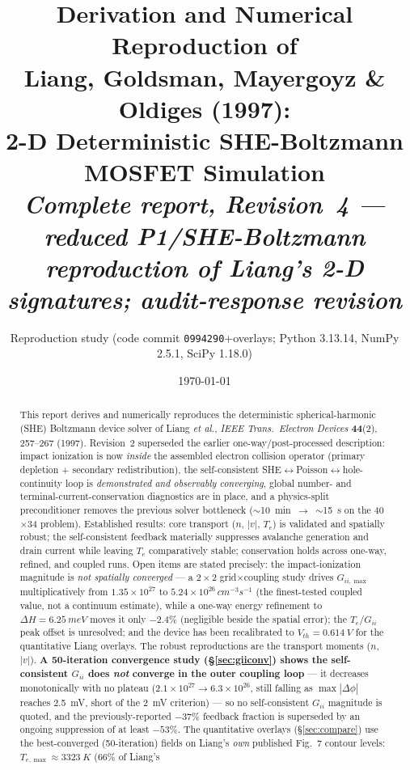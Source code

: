 \documentclass[11pt]{article}
\title{\textbf{Derivation and Numerical Reproduction of\\
Liang, Goldsman, Mayergoyz \& Oldiges (1997):\\
2-D Deterministic SHE-Boltzmann MOSFET Simulation}\\[5pt]
\large\textit{Complete report, Revision~4 --- reduced P1/SHE-Boltzmann reproduction of Liang's 2-D signatures; audit-response revision}}
\author{Reproduction study \quad\small(code commit \texttt{0994290}+overlays; Python 3.13.14, NumPy 2.5.1, SciPy 1.18.0)}
\date{\today}
\begin{document}
\maketitle

\begin{abstract}
\noindent
This report derives and numerically reproduces the deterministic spherical-harmonic (SHE)
Boltzmann device solver of Liang \emph{et al.}, \emph{IEEE Trans.\ Electron Devices}
\textbf{44}(2), 257--267 (1997). Revision~2 superseded the earlier one-way/post-processed
description: impact ionization is now \emph{inside} the assembled electron collision operator
(primary depletion + secondary redistribution), the self-consistent
SHE$\leftrightarrow$Poisson$\leftrightarrow$hole-continuity loop is \emph{demonstrated and
observably converging}, global number- and terminal-current-conservation diagnostics are in
place, and a physics-split preconditioner removes the previous solver bottleneck
($\sim$10~min~$\to$~$\sim$15~s on the 40$\times$34 problem). Established results: core
transport ($n$, $|v|$, $T_e$) is validated and spatially robust; the self-consistent feedback
materially suppresses avalanche generation and drain current while leaving $T_e$ comparatively
stable; conservation holds across one-way, refined, and coupled runs. Open items are stated
precisely: the impact-ionization magnitude is \emph{not spatially converged} --- a
$2\times2$ grid$\times$coupling study drives $G_{ii,\max}$ multiplicatively from
$1.35\times10^{27}$ to $5.24\times10^{26}\,\si{cm^{-3}s^{-1}}$ (the finest-tested coupled value,
not a continuum estimate), while a one-way energy refinement to $\Delta H=\SI{6.25}{meV}$ moves it
only $-2.4\%$ (negligible beside the spatial error); the $T_e$/$G_{ii}$ peak offset is unresolved;
and the device has been recalibrated to $V_{th}=\SI{0.614}{V}$ for the quantitative Liang overlays.
The robust reproductions are the transport moments ($n$, $|v|$). \textbf{A 50-iteration convergence
study (\S\ref{sec:giiconv}) shows the self-consistent $G_{ii}$ does \emph{not} converge in the outer
coupling loop} --- it decreases monotonically with no plateau ($2.1\times10^{27}\to6.3\times10^{26}$,
still falling as $\max|\Delta\phi|$ reaches \SI{2.5}{mV}, short of the \SI{2}{mV} criterion) --- so no
self-consistent $G_{ii}$ magnitude is quoted, and the previously-reported $-37\%$ feedback fraction
is superseded by an ongoing suppression of at least $-53\%$.
The quantitative overlays (\S\ref{sec:compare}) use the best-converged (50-iteration) fields on
Liang's \emph{own} published Fig.~7 contour levels: $T_{e,\max}\approx\SI{3323}{K}$ (66\% of Liang's

\end{abstract}
\end{document}
